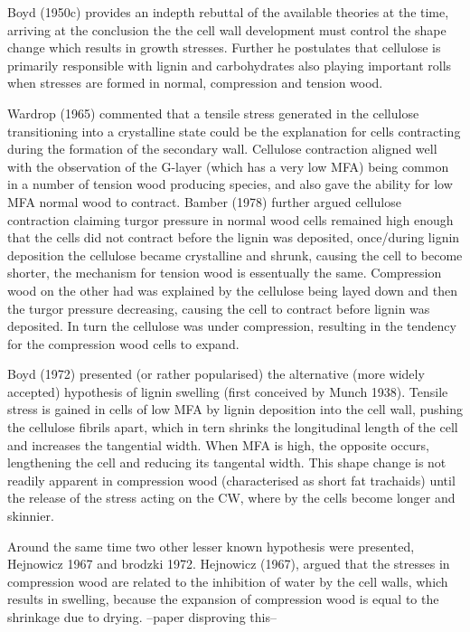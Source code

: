 \documentclass{article}
\begin{document}
Boyd (1950c) provides an indepth rebuttal of the available theories at the time,
arriving at the conclusion the the cell wall development must control the shape
change which results in growth stresses. Further he postulates that cellulose
is primarily responsible with lignin and carbohydrates also playing important
rolls when stresses are formed in normal, compression and tension wood.

Wardrop (1965) commented that a tensile stress generated in the cellulose
transitioning into a crystalline state could be the explanation for cells
contracting during the formation of the secondary wall. Cellulose contraction
aligned well with the observation of the G-layer (which has  a very low
MFA) being common in a number of tension wood producing species, and also gave
the ability for low MFA normal wood to contract. Bamber (1978) further argued
cellulose contraction claiming turgor pressure in normal wood cells remained
high enough that the cells did not contract before the lignin was deposited,
once/during lignin deposition the cellulose became crystalline and shrunk,
causing the cell to become shorter, the mechanism for tension wood is
essentually the same. Compression wood on the other had was explained by the
cellulose being layed down and then the turgor pressure decreasing, causing the
cell to contract before lignin was deposited. In turn the cellulose was under
compression, resulting in the tendency for the compression wood cells to
expand.

Boyd (1972) presented (or rather popularised) the alternative (more widely
accepted) hypothesis of lignin swelling (first conceived by Munch 1938). Tensile
stress is gained in cells of low MFA by lignin deposition into the cell wall,
pushing the cellulose fibrils apart, which in tern shrinks the longitudinal
length of the cell and increases the tangential width. When MFA is high, the
opposite occurs, lengthening the cell and reducing its tangental width. This
shape change is not readily apparent in compression wood (characterised as short fat
trachaids) until the release of the stress acting on the CW, where by the cells
become longer and skinnier.

Around the same time two other lesser known hypothesis were presented, Hejnowicz
1967 and brodzki 1972. Hejnowicz (1967), argued that the stresses in compression
wood are related to the inhibition of water by the cell walls, which results in
swelling, because the expansion of compression wood is equal to the shrinkage
due to drying. --paper disproving this--
\end{document}
